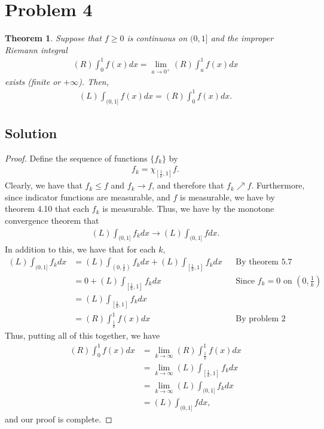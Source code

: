 \documentclass[10pt,a4paper]{article}
\theoremstyle{theorem}
\newtheorem{theorem}{Theorem}
\theoremstyle{definition}
\begin{document}
\section*{Problem 4}
\begin{theorem}
Suppose that $f \geq 0$ is continuous on $(0, 1]$ and the improper Riemann integral 
\begin{align*}
(R) \int_0^1 f(x) dx = \lim_{a \to 0^+} (R) \int_a^1 f(x) dx
\end{align*}
exists (finite or $+\infty$). Then,
\begin{align*}
(L) \int_{(0, 1]} f(x) dx = (R) \int_0^1 f(x) dx.
\end{align*}
\end{theorem}

\subsection*{Solution}
\begin{proof}
Define the sequence of functions $\{f_k \}$ by 
\begin{align*}
f_k = \chi_{[\frac{1}{k},  1]} f.
\end{align*}
Clearly, we have that $f_k \leq f$ and $f_k \to f$, and therefore that $f_k \nearrow f$.  Furthermore, since indicator functions are measurable, and $f$ is measurable, we have by theorem 4.10 that each $f_k$ is measurable. Thus, we have by the monotone convergence theorem that
\begin{align*}
(L) \int_{(0, 1]} f_k dx \to (L) \int_{(0, 1]} f dx.
\end{align*}
In addition to this, we have that for each $k$,
\begin{align*}
(L) \int_{(0, 1]} f_k dx &= (L) \int_{(0, \frac{1}{k})} f_k dx + (L) \int_{[\frac{1}{k}, 1]} f_k dx &&\text{By theorem 5.7}\\
&= 0 + (L) \int_{[\frac{1}{k}, 1]} f_k dx &&\text{Since } f_k = 0 \text{ on } (0, \frac{1}{k}) \\
&= (L) \int_{[\frac{1}{k}, 1]} f_k dx\\
&= (R) \int_{\frac{1}{k}}^1 f(x) dx &&\text{By problem 2}
\end{align*}
Thus, putting all of this together, we have
\begin{align*}
(R) \int_0^1 f(x) dx &= \lim_{k \to \infty} (R) \int_{\frac{1}{k}}^1 f(x) dx\\
&= \lim_{k \to \infty} (L) \int_{[\frac{1}{k}, 1]} f_k dx\\
&= \lim_{k \to \infty} (L) \int_{(0, 1]} f_k dx\\
&= (L) \int_{(0, 1]} f dx,
\end{align*}
and our proof is complete.
\end{proof}
\end{document}
